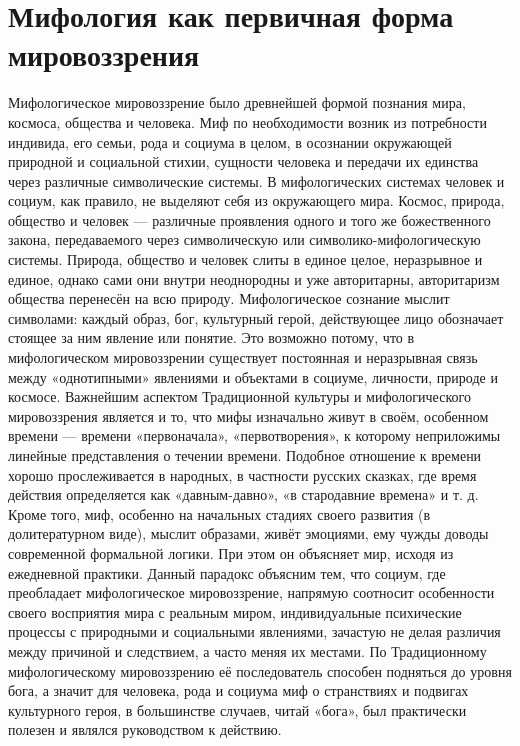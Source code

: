 \documentclass[12pt]{article}
\begin{document}
\newpage
\section{Мифология как первичная форма мировоззрения}
Мифологическое мировоззрение было древнейшей формой познания мира, космоса, общества и человека. Миф
по  необходимости  возник  из  потребности  индивида,  его  семьи,  рода  и  социума  в  целом,  в  осознании
окружающей природной и социальной стихии, сущности человека и передачи их единства через различные
символические системы. В мифологических системах человек и социум, как правило, не выделяют себя из
окружающего  мира.  Космос,  природа,  общество  и  человек  —  различные  проявления  одного  и  того  же
божественного  закона,  передаваемого  через  символическую  или  символико-мифологическую  системы.
Природа,  общество  и  человек  слиты  в  единое  целое,  неразрывное  и  единое,  однако  сами  они  внутри
неоднородны и уже авторитарны, авторитаризм общества перенесён на всю природу.
Мифологическое  сознание  мыслит  символами:  каждый  образ,  бог,  культурный  герой,  действующее  лицо
обозначает стоящее за ним явление или понятие. Это возможно потому, что в мифологическом мировоззрении
существует  постоянная  и  неразрывная  связь  между  «однотипными»  явлениями  и  объектами  в  социуме,
личности, природе и космосе.
Важнейшим аспектом Традиционной культуры и мифологического мировоззрения является и то, что мифы
изначально  живут  в  своём,  особенном  времени  —  времени  «первоначала»,  «первотворения»,  к  которому
неприложимы  линейные  представления  о  течении  времени.  Подобное  отношение  к  времени  хорошо
прослеживается  в  народных,  в  частности русских  сказках,  где время  действия  определяется как «давным-давно», «в стародавние времена» и т. д.
Кроме того, миф, особенно на начальных стадиях своего развития (в долитературном виде), мыслит образами,
живёт эмоциями, ему чужды доводы современной формальной логики. При этом он объясняет мир, исходя из
ежедневной  практики.  Данный  парадокс  объясним  тем,  что  социум,  где  преобладает  мифологическое
мировоззрение, напрямую соотносит особенности своего восприятия мира с реальным миром, индивидуальные
психические процессы с природными и социальными явлениями, зачастую не делая различия между причиной
и следствием, а часто меняя их местами.
По Традиционному мифологическому мировоззрению её последователь способен подняться до уровня бога, а
значит для человека, рода и социума миф о странствиях и подвигах культурного героя, в большинстве случаев,
читай «бога», был практически полезен и являлся руководством к действию.
\end{document}
